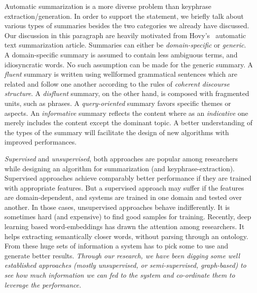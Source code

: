 \documentclass[a4paper]{report}
\begin{document}
\par  Automatic summarization is a more diverse problem than keyphrase extraction/generation. In order to support the statement, we briefly talk about various types of summaries besides the two categories we already have discussed. Our discussion in this paragraph are heavily motivated from Hovy's~\cite{Hovy:1998:ATS:1119089.1119121} automatic text summarization article. Summaries can either be \emph{domain-specific} or \emph{generic}. A domain-specific summary is assumed to contain less ambiguous terms, and idiosyncratic words. No such assumption can be made for the generic summary. A \emph{fluent} summary is written using wellformed grammatical sentences which are related and follow one another according to the rules of \emph{coherent discourse structure}. A \emph{disfluent} summary, on the other hand, is composed with fragmented units, such as phrases. A \emph{query-oriented} summary favors specific themes or aspects. An \emph{informative} summary reflects the content where as an \emph{indicative} one merely includes the content except the dominant topic. A better understanding of the types of the summary will facilitate the design of new algorithms with improved performances.\\ 

\par \emph{Supervised} and \emph{unsupervised}, both approaches are popular among researchers while designing an algorithm for summarization (and keyphrase-extraction). Supervised approaches achieve comparably better performance if they are trained with appropriate features. But a supervised approach may suffer if the features are domain-dependent, and systems are trained in one domain and tested over another. In those cases, unsupervised approaches behave indifferently. It is sometimes hard (and expensive) to find good samples for training. Recently, deep learning based word-embeddings has drawn the attention among researchers. It helps extracting semantically closer words, without parsing through an ontology. From these huge sets of information a system has to pick some to use and generate better results.\emph{ Through our research, we have been digging some well established approaches (mostly unsupervised, or semi-supervised, graph-based) to see how much information we can fed to the system and co-ordinate them to leverage the performance.}\\
\end{document}
